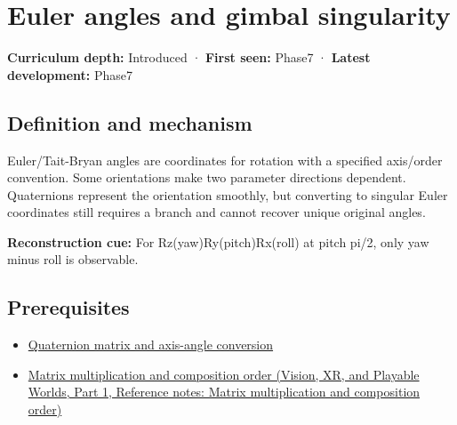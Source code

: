 \hypertarget{appendix-5f723fbd0593}{}\label{referencestart:appendix-5f723fbd0593}
\section{Euler angles and gimbal singularity}\label{appendix-5f723fbd0593-euler-angles-and-gimbal-singularity}

\hypertarget{appendix-5f723fbd0593-euler-angles-and-gimbal-singularity}{}

\textbf{Curriculum depth:} Introduced · \textbf{First seen:} Phase7 · \textbf{Latest development:} Phase7

\begin{allmightroledefinition}

\subsection{Definition and mechanism}\label{appendix-5f723fbd0593-definition-and-mechanism}

\hypertarget{appendix-5f723fbd0593-definition-and-mechanism}{}

Euler/Tait-Bryan angles are coordinates for rotation with a specified axis/order convention. Some orientations make two parameter directions dependent. Quaternions represent the orientation smoothly, but converting to singular Euler coordinates still requires a branch and cannot recover unique original angles.

\end{allmightroledefinition}

\textbf{Reconstruction cue:} For Rz(yaw)Ry(pitch)Rx(roll) at pitch pi/2, only yaw minus roll is observable.

\subsection{Prerequisites}\label{appendix-5f723fbd0593-prerequisites}

\hypertarget{appendix-5f723fbd0593-prerequisites}{}

\begin{itemize}
\tightlist
\item
  \hyperref[appendix-26d8da71f6c4]{Quaternion matrix and axis-angle conversion}
\item
  \href{../07-Vision-XR-and-Playable-Worlds-P01/main.pdf\#appendix-ab31ef447dbf}{Matrix multiplication and composition order (Vision, XR, and Playable Worlds, Part 1, Reference notes: Matrix multiplication and composition order)}
\end{itemize}

